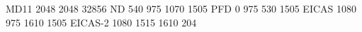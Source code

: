 MD11 2048 2048 32856
ND       540  975 1070 1505
PFD        0  975  530 1505
EICAS   1080  975 1610 1505
EICAS-2 1080 1515 1610  204
